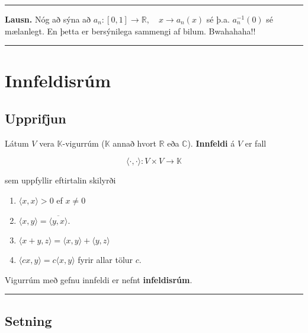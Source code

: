 \documentclass[]{book}
\providecommand{\tightlist}{%
  \setlength{\itemsep}{0pt}\setlength{\parskip}{0pt}}
\begin{document}
\begin{center}\rule{0.5\linewidth}{\linethickness}\end{center}

\textbf{Lausn.} Nóg að sýna að \(a_n:[0,1]\rightarrow\mathbb R, \quad x\rightarrow a_n(x)\) sé þ.a. \(a_n^{-1}(0)\) sé mælanlegt. En þetta er bersýnilega sammengi af bilum. Bwahahaha!!

\begin{center}\rule{0.5\linewidth}{\linethickness}\end{center}

\hypertarget{innfeldisrum}{%
\chapter{Innfeldisrúm}\label{innfeldisrum}}

\hypertarget{upprifjun-3}{%
\section*{Upprifjun}\label{upprifjun-3}}

Látum \(V\) vera \(\mathbb K\)-vigurrúm (\(\mathbb K\) annað hvort \(\mathbb R\) eða \(\mathbb C\)). \textbf{Innfeldi} á \(V\) er fall

\[
\langle \cdot,\cdot \rangle:V\times V\rightarrow\mathbb K
\]

sem uppfyllir eftirtalin skilyrði

\begin{enumerate}
\def\labelenumi{\arabic{enumi}.}
\tightlist
\item
  \(\langle x,x \rangle > 0\) ef \(x\neq 0\)
\item
  \(\langle x,y \rangle = \overline{\langle y,x \rangle}\).
\item
  \(\langle x + y,z \rangle = \langle x,y \rangle + \langle y,z \rangle\)
\item
  \(\langle cx,y \rangle = c\langle x,y \rangle\) fyrir allar tölur \(c\).
\end{enumerate}

Vigurrúm með gefnu innfeldi er nefnt \textbf{infeldisrúm}.

\begin{center}\rule{0.5\linewidth}{\linethickness}\end{center}

\hypertarget{setning-75}{%
\section*{Setning}\label{setning-75}}
\end{document}
